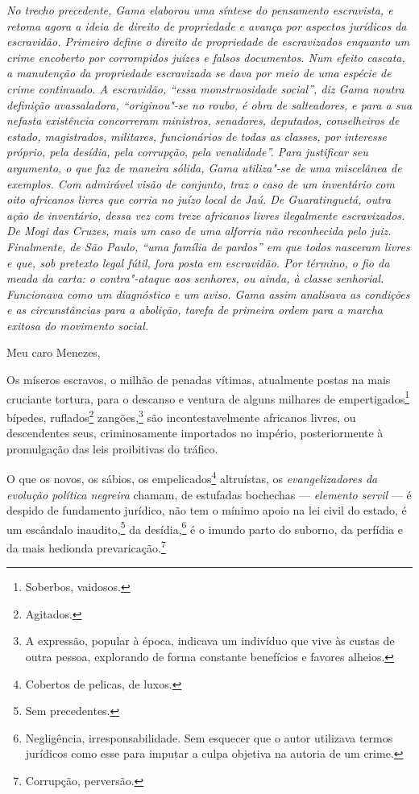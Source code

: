 \begin{flushleft}
{\footnotesize\itshape
No trecho precedente, Gama elaborou uma síntese do pensamento
escravista, e retoma agora a ideia de direito de propriedade
e avança por aspectos jurídicos da escravidão.
Primeiro define o direito de propriedade de escravizados enquanto um crime encoberto por corrompidos juízes e falsos documentos.
Num efeito cascata, a manutenção da
propriedade escravizada se dava por meio de
uma espécie de crime continuado. A escravidão, ``essa monstruosidade
social'', diz Gama noutra definição avassaladora, ``originou"-se no roubo,
é obra de salteadores, e para a sua nefasta existência concorreram
ministros, senadores, deputados, conselheiros de estado, magistrados,
militares, funcionários de todas as classes, por interesse próprio, pela
desídia, pela corrupção, pela venalidade''. Para justificar seu
argumento, o que faz de maneira sólida, Gama utiliza"-se de uma
miscelânea de exemplos. Com admirável visão de conjunto, traz o caso de
um inventário com oito africanos livres que corria no juízo local de
Jaú. De Guaratinguetá, outra ação de inventário, dessa vez com treze
africanos livres ilegalmente escravizados. De Mogi das Cruzes, mais um
caso de uma alforria não reconhecida pelo juiz. Finalmente, de São
Paulo, ``uma família de pardos'' em que todos nasceram livres e que, sob
pretexto legal fútil, fora posta em escravidão. Por término, o fio da
meada da carta: o contra"-ataque aos senhores, ou ainda, à classe
senhorial. Funcionava como um diagnóstico e um aviso. 
Gama assim analisava as condições e as circunstâncias para a abolição, tarefa de
primeira ordem para a marcha exitosa do movimento social.}
\end{flushleft}\pagebreak

\noindent{}Meu caro Menezes,\smallskip

Os míseros escravos, o milhão de penadas vítimas, atualmente postas na
mais cruciante tortura, para o descanso e ventura de alguns milhares de
empertigados\footnote{Soberbos, vaidosos.} bípedes, ruflados\footnote{
  Agitados.} zangões,\footnote{A expressão, popular à época, indicava
  um indivíduo que vive às custas de outra pessoa, explorando de forma
  constante benefícios e favores alheios.} são incontestavelmente
africanos livres, ou descendentes seus, criminosamente importados no
império, posteriormente à promulgação das leis proibitivas do tráfico.

O que os novos, os sábios, os empelicados\footnote{Cobertos de
  pelicas, de luxos.} altruístas, os \emph{evangelizadores da evolução
política negreira} chamam, de estufadas bochechas --- \emph{elemento
servil} --- é despido de fundamento jurídico, não tem o mínimo apoio na
lei civil do estado, é um escândalo inaudito,\footnote{Sem precedentes.}
da desídia,\footnote{Negligência, irresponsabilidade. Sem esquecer que
  o autor utilizava termos jurídicos como esse para imputar a culpa
  objetiva na autoria de um crime.} é o imundo parto do suborno, da
perfídia e da mais hedionda prevaricação.\footnote{Corrupção,
  perversão.}


